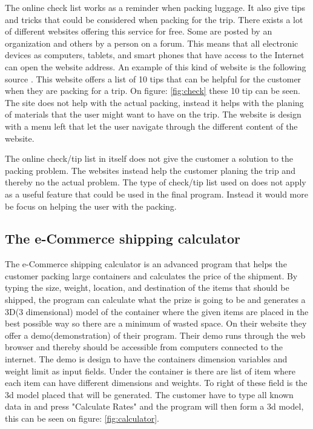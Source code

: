 The online check list works as a reminder when packing luggage. It also give tips and tricks that could be considered when packing for the trip. There exists a lot of different websites offering this service for free. Some are posted by an organization and others by a person on a forum. This means that all electronic devices as computers, tablets, and smart phones that have access to the Internet can open the website address.
An example of this kind of website is the following source \citep{onlinecheck}. This website offers a list of 10 tips that can be helpful for the customer when they are packing for a trip. On figure: \ref{fig:check} these 10 tip can be seen.
The site does not help with the actual packing, instead it helps with the planing of materials that the user might want to have on the trip.
The website is design with a menu left that let the user navigate through the different content of the website.


The online check/tip list in itself does not give the customer a solution to the packing problem. The websites instead help the customer planing the trip and thereby no the actual problem. The type of check/tip list used on \citep{onlinecheck} does not apply as a useful feature that could be used in the final program. Instead it would more be focus on helping the user with the packing.

\subsection*{The e-Commerce shipping calculator}

The e-Commerce shipping calculator is an advanced program that helps the customer packing large containers and calculates the price of the shipment.
By typing the size, weight, location, and destination of the items that should be shipped, the program can calculate what the prize is going to be and generates a 3D(3 dimensional) model of the container where the given items are placed in the best possible way so there are a minimum of wasted space. On their website \citep{solvingmaze} they offer a demo(demonstration) of their program. Their demo runs through the web browser and thereby should be accessible from computers connected to the internet.
The demo is design to have the containers dimension variables and weight limit as input fields. Under the container is there are list of item where each item can have different dimensions and weights. To right of these field is the 3d model placed that will be generated.
The customer have to type all known data in and press "Calculate Rates" and the program will then form a 3d model, this can be seen on figure: \ref{fig:calculator}.

